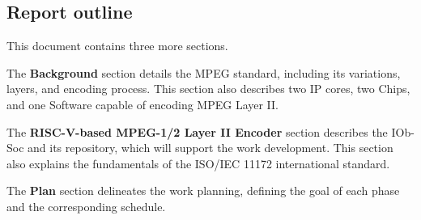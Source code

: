 

\subsection{Report outline}

This document contains three more sections.

The \textbf{Background} section details the MPEG standard, including its variations, layers, and encoding process. This section also describes two IP cores, two Chips, and one Software capable of encoding MPEG Layer II.

The \textbf{RISC-V-based MPEG-1/2 Layer II Encoder} section describes the IOb-Soc and its repository, which will support the work development. This section also explains the fundamentals of the ISO/IEC 11172 international standard.

The \textbf{Plan} section delineates the work planning, defining the goal of each phase and the corresponding schedule.
